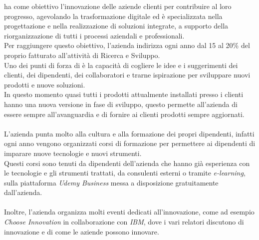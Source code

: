 {\azienda} ha come obiettivo l’innovazione delle aziende clienti per contribuire al loro progresso, 
agevolando la trasformazione digitale ed è specializzata nella progettazione e nella realizzazione di soluzioni integrate, 
a supporto della riorganizzazione di tutti i processi aziendali e professionali.\\
Per raggiungere questo obiettivo, l'azienda indirizza ogni anno dal 15 al 20\% del proprio fatturato all’attività di Ricerca e Sviluppo.\\
Uno dei punti di forza di {\azienda} è la capacità di cogliere le idee e i suggerimenti dei clienti, dei dipendenti, dei collaboratori e trarne ispirazione per sviluppare nuovi prodotti e nuove soluzioni.\\
In questo momento quasi tutti i prodotti attualmente installati presso i clienti hanno una nuova versione in fase di sviluppo,
questo permette all'azienda di essere sempre all'avanguardia e di fornire ai clienti prodotti sempre aggiornati.\\
\\
L'azienda punta molto alla cultura e alla formazione dei propri dipendenti, 
infatti ogni anno vengono organizzati corsi di formazione per permettere ai dipendenti di imparare nuove tecnologie e nuovi strumenti.\\
Questi corsi sono tenuti da dipendenti dell'azienda che hanno già esperienza con le tecnologie e gli strumenti trattati, da consulenti esterni 
o tramite \textit{e-learning}, sulla piattaforma \textit{Udemy Business} messa a disposizione gratuitamente dall'azienda.\\
\\
Inoltre, l'azienda organizza molti eventi dedicati all'innovazione, come ad esempio \textit{Choose Innovation} in collaborazione con \textit{IBM},
dove i vari relatori discutono di innovazione e di come le aziende possono innovare.\\